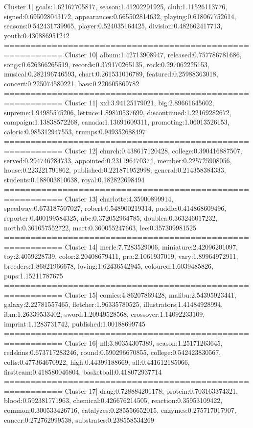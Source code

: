 Cluster 1| goals:1.62167705817, season:1.41202291925, club:1.11526113776, signed:0.695028043172, appearances:0.665502814632, playing:0.618067752614, seasons:0.542431739965, player:0.524035164425, division:0.482662417713, youth:0.430886951242
========================================================= 
Cluster 10| album:1.42713908947, released:0.757786781686, songs:0.626366265519, records:0.379170265135, rock:0.297062225153, musical:0.282196746593, chart:0.261531016789, featured:0.25988363018, concert:0.225074580221, bass:0.220605869782
========================================================= 
Cluster 11| xxl:3.94125179021, big:2.89661645602, supreme:1.94985575206, lettuce:1.89870537699, discontinued:1.22169282672, campaign:1.13838572268, canada:1.13691609311, promoting:1.06013526153, caloric:0.985312947553, trumps:0.949352688497
========================================================= 
Cluster 12| church:0.438617120428, college:0.390416887507, served:0.294746284733, appointed:0.231196470374, member:0.225725908056, house:0.223221791862, published:0.221871952998, general:0.214358384333, students:0.188003810638, royal:0.182822698494
========================================================= 
Cluster 13| charlotte:4.35900899914, speedway:0.673187507027, robert:0.548900219314, puddle:0.414868609496, reporter:0.400199584325, nbc:0.372052964785, doublea:0.363246017232, north:0.361657552722, mart:0.360055247663, lee:0.357309981525
========================================================= 
Cluster 14| merle:7.7283529006, miniature:2.42096201097, toy:2.4059228739, color:2.20408679411, pra:2.1061937019, vary:1.89964972911, breeders:1.86821966678, loving:1.62436542945, coloured:1.6039485826, pups:1.15211787675
========================================================= 
Cluster 15| comics:4.86207869428, malibu:2.54395923441, galaxy:2.22781557465, fletcher:1.96335780525, illustrators:1.41484928994, ibm:1.26339533402, sword:1.20949528568, crossover:1.14092233109, imprint:1.1283731742, published:1.00188699745
========================================================= 
Cluster 16| nfl:3.80354307389, season:1.25171263645, redskins:0.673717283246, round:0.590296670855, college:0.542423830567, colts:0.477364670922, high:0.44399188669, afl:0.441612185066, firstteam:0.418580046804, basketball:0.418072937714
========================================================= 
Cluster 17| drug:0.728884201178, protein:0.703163374321, blood:0.592381771963, chemical:0.426676214505, reaction:0.35953109422, common:0.300533426716, catalyzes:0.285556652015, enzymes:0.275717017907, cancer:0.272762999538, substrates:0.238558534269
